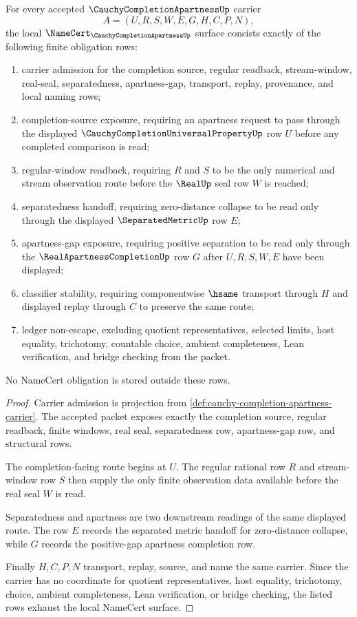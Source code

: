 \begin{theorem}
\label{thm:cauchy-completion-apartness-namecert-obligations}
For every accepted $\CauchyCompletionApartnessUp$ carrier
$$
A=(U,R,S,W,E,G,H,C,P,N),
$$
the local $\NameCert_{\CauchyCompletionApartnessUp}$ surface consists exactly of the following finite obligation rows:
\begin{enumerate}
\item carrier admission for the completion source, regular readback, stream-window, real-seal, separatedness, apartness-gap, transport, replay, provenance, and local naming rows;
\item completion-source exposure, requiring an apartness request to pass through the displayed $\CauchyCompletionUniversalPropertyUp$ row $U$ before any completed comparison is read;
\item regular-window readback, requiring $R$ and $S$ to be the only numerical and stream observation route before the $\RealUp$ seal row $W$ is reached;
\item separatedness handoff, requiring zero-distance collapse to be read only through the displayed $\SeparatedMetricUp$ row $E$;
\item apartness-gap exposure, requiring positive separation to be read only through the $\RealApartnessCompletionUp$ row $G$ after $U,R,S,W,E$ have been displayed;
\item classifier stability, requiring componentwise $\hsame$ transport through $H$ and displayed replay through $C$ to preserve the same route;
\item ledger non-escape, excluding quotient representatives, selected limits, host equality, trichotomy, countable choice, ambient completeness, Lean verification, and bridge checking from the packet.
\end{enumerate}
No NameCert obligation is stored outside these rows.
\end{theorem}
\begin{proof}
Carrier admission is projection from \autoref{def:cauchy-completion-apartness-carrier}. The accepted packet exposes exactly the completion source, regular readback, finite windows, real seal, separatedness row, apartness-gap row, and structural rows.

The completion-facing route begins at $U$. The regular rational row $R$ and stream-window row $S$ then supply the only finite observation data available before the real seal $W$ is read.

Separatedness and apartness are two downstream readings of the same displayed route. The row $E$ records the separated metric handoff for zero-distance collapse, while $G$ records the positive-gap apartness completion row.

Finally $H,C,P,N$ transport, replay, source, and name the same carrier. Since the carrier has no coordinate for quotient representatives, host equality, trichotomy, choice, ambient completeness, Lean verification, or bridge checking, the listed rows exhaust the local NameCert surface.
\end{proof}

